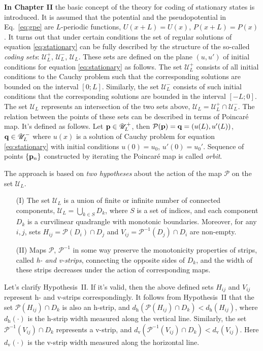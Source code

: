 \documentclass[candidate, href, colorlinks]{disser}
\begin{document}
\textbf{In Chapter II} the basic concept of the theory for coding of stationary states is introduced.
It is assumed that the potential and the pseudopotential in Eq.~\eqref{eq:gpe} are $L$-periodic functions, $U(x + L) = U(x)$, $P(x + L) = P(x)$.
It turns out that under certain conditions the set of regular solutions of equation \eqref{eq:stationary} can be fully described by the structure of the so-called {\it coding sets}: $\mathscr{U}_L^+$, $\mathscr{U}_L^-$, $\mathscr{U}_L$.
These sets are defined on the plane $(u, u')$ of initial conditions for equation \eqref{eq:stationary} as follows.
The set $\mathscr{U}_L^+$ consists of all initial conditions to the Cauchy problem such that the corresponding solutions are bounded on the interval $[0; L]$.
Similarly, the set $\mathscr{U}_L^-$ consists of such initial conditions that the corresponding solutions are bounded in the interval $[-L; 0]$.
The set $\mathscr{U}_L$ represents an intersection of the two sets above, $\mathscr{U}_L = \mathscr{U}_L^+ \cap \mathscr{U}_L^-$.
The relation between the points of these sets can be described in terms of Poincar\'e map.
It's defined as follows.
Let $\vb{p} \in \mathscr{U}_L^+$, then $\mathcal{P} (\vb{p}) = \vb{q} = (u(L), u'(L))$, $\vb{q} \in \mathscr{U}_L^-$ where $u(x)$ is a solution of Cauchy problem for equation \eqref{eq:stationary} with initial conditions $u(0) = u_0$, $u'(0) = u_0'$.
Sequence of points $\{ \vb{p}_n \}$ constructed by iterating the Poincar\'e map is called {\it orbit}.

The approach is based on {\it two hypotheses} about the action of the map $\mathcal{P}$ on the set $\mathscr{U}_L$.
\begin{itemize}
	\item[(I)] The set $\mathscr{U}_L$ is a union of finite or infinite number of connected components, $\mathscr{U}_L = \bigcup_{k \in S} D_k$, where $S$ is a set of indices, and each component $D_k$ is a curvilinear quadrangle with monotonic boundaries.
		Moreover, for any $i, j$, sets $H_{ij} = \mathcal{P}(D_i) \cap D_j$ and $V_{ij} = \mathcal{P}^{-1}(D_j) \cap D_i$ are non-empty.
	\item[(II)] Maps $\mathcal{P}$, $\mathcal{P}^{-1}$ in some way preserve the monotonicity properties of strips, called {\it h- and v-strips}, connecting the opposite sides of $D_k$, and the width of these strips decreases under the action of corresponding maps. 
\end{itemize}
Let's clarify Hypothesis~II.
If it's valid, then the above defined sets $H_{ij}$ and $V_{ij}$ represent h- and v-strips correspondingly.
It follows from Hypothesis~II that the set $\mathcal{P}(H_{ij}) \cap D_k$ is also an h-strip, and $d_{\mathrm{h}}(\mathcal{P}(H_{ij}) \cap D_k) < d_{\mathrm{h}}(H_{ij})$, where $d_{\mathrm{h}}(\cdot)$ is the h-strip width measured along the vertical line.
Similarly, the set $\mathcal{P}^{-1}(V_{ij}) \cap D_k$ represents a v-strip, and $d_{\mathrm{v}}(\mathcal{P}^{-1}(V_{ij}) \cap D_k) < d_{\mathrm{v}}(V_{ij})$.
Here $d_{\mathrm{v}}(\cdot)$ is the v-strip width measured along the horizontal line.
\end{document}
